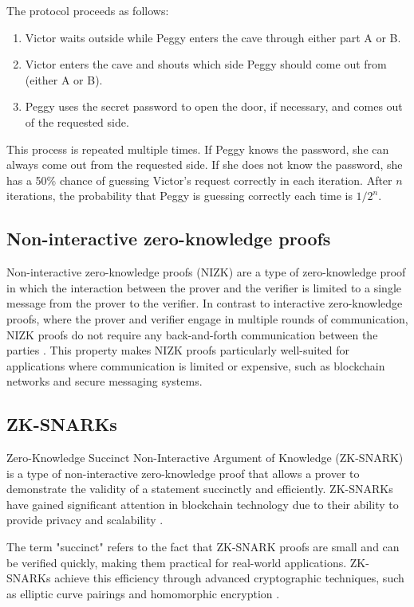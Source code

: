 The protocol proceeds as follows:

\begin{enumerate}
    \item Victor waits outside while Peggy enters the cave through either part A or B.
    \item Victor enters the cave and shouts which side Peggy should come out from (either A or B).
    \item Peggy uses the secret password to open the door, if necessary, and comes out of the requested side.
\end{enumerate}

This process is repeated multiple times. If Peggy knows the password, she can always come out from the requested side. If she does not know the password, she has a 50\% chance of guessing Victor's request correctly in each iteration. After $n$ iterations, the probability that Peggy is guessing correctly each time is $1/2^n$.


\subsection{Non-interactive zero-knowledge proofs}
Non-interactive zero-knowledge proofs (NIZK) are a type of zero-knowledge proof in which the interaction between the prover and the verifier is limited to a single message from the prover to the verifier. In contrast to interactive zero-knowledge proofs, where the prover and verifier engage in multiple rounds of communication, NIZK proofs do not require any back-and-forth communication between the parties \cite{blum1988noninteractive}. This property makes NIZK proofs particularly well-suited for applications where communication is limited or expensive, such as blockchain networks and secure messaging systems.

\subsection{ZK-SNARKs}
Zero-Knowledge Succinct Non-Interactive Argument of Knowledge (ZK-SNARK) is a type of non-interactive zero-knowledge proof that allows a prover to demonstrate the validity of a statement succinctly and efficiently. ZK-SNARKs have gained significant attention in blockchain technology due to their ability to provide privacy and scalability \cite{bensasson2013snarks}.

The term "succinct" refers to the fact that ZK-SNARK proofs are small and can be verified quickly, making them practical for real-world applications. ZK-SNARKs achieve this efficiency through advanced cryptographic techniques, such as elliptic curve pairings and homomorphic encryption \cite{groth2016size}.

